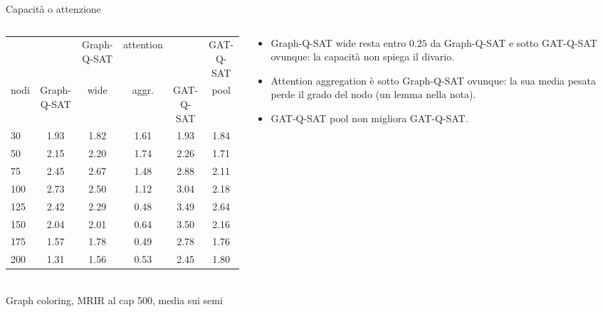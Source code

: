 \documentclass[aspectratio=169]{beamer}
\newcommand{\T}[2]{#2}
\newcommand{\T}[2]{#1}
\begin{document}
\begin{frame}{\T{Capacity or attention}{Capacit\`a o attenzione}}
  \begin{columns}[c,totalwidth=\textwidth]
    \begin{column}{0.65\textwidth}
      \centering\footnotesize\setlength{\tabcolsep}{1.5pt}
      \begin{tabular}{lccccc}
        \toprule
         & & Graph-Q-SAT & attention & & GAT-Q-SAT \\
        \T{nodes}{nodi} & Graph-Q-SAT & wide & aggr. & GAT-Q-SAT & pool \\
        \midrule
        30 & 1.93 & 1.82 & 1.61 & 1.93 & 1.84 \\
        50 & 2.15 & 2.20 & 1.74 & 2.26 & 1.71 \\
        75 & 2.45 & 2.67 & 1.48 & 2.88 & 2.11 \\
        100 & 2.73 & 2.50 & 1.12 & 3.04 & 2.18 \\
        125 & 2.42 & 2.29 & 0.48 & 3.49 & 2.64 \\
        150 & 2.04 & 2.01 & 0.64 & 3.50 & 2.16 \\
        175 & 1.57 & 1.78 & 0.49 & 2.78 & 1.76 \\
        200 & 1.31 & 1.56 & 0.53 & 2.45 & 1.80 \\
        \bottomrule
      \end{tabular}\\[1mm]
      {\scriptsize \T{Graph coloring, MRIR at cap 500, mean over the seeds}{Graph coloring, MRIR al cap 500, media sui semi}}
    \end{column}
    \begin{column}{0.34\textwidth}
      \begin{itemize}\footnotesize
        \item \T{Graph-Q-SAT wide stays within $0.25$ of Graph-Q-SAT and below GAT-Q-SAT
              everywhere: the capacity does not explain the gap.}%
              {Graph-Q-SAT wide resta entro $0.25$ da Graph-Q-SAT e sotto GAT-Q-SAT ovunque:
              la capacit\`a non spiega il divario.}
        \item \T{Attention aggregation is below Graph-Q-SAT everywhere: its weighted mean
              loses the degree of the node (a lemma in the note).}%
              {Attention aggregation \`e sotto Graph-Q-SAT ovunque: la sua media pesata perde
              il grado del nodo (un lemma nella nota).}
        \item \T{GAT-Q-SAT pool does not improve GAT-Q-SAT.}%
              {GAT-Q-SAT pool non migliora GAT-Q-SAT.}
      \end{itemize}
    \end{column}
  \end{columns}
\end{frame}
\end{document}
